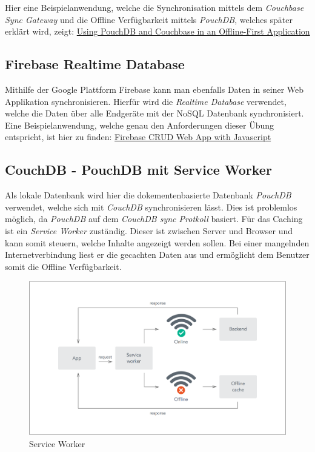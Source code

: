 Hier eine Beispielanwendung, welche die Synchronisation mittels dem \textit{Couchbase Sync Gateway} und die Offline Verfügbarkeit mittels \textit{PouchDB}, welches später erklärt wird, zeigt:
\href{https://www.codementor.io/pmbanugo/using-pouchdb-and-couchbase-in-an-offline-first-application-5pw2sxs6o}{Using PouchDB and Couchbase in an Offline-First Application\cite{syncgatewaytutorial}}

\url{}

\subsection{Firebase Realtime Database}
Mithilfe der Google Plattform Firebase kann man ebenfalls Daten in seiner Web Applikation synchronisieren. Hierfür wird die \textit{Realtime Database}\cite{realtimedb} verwendet, welche die Daten über alle Endgeräte mit der NoSQL Datenbank synchronisiert. Eine Beispielanwendung, welche genau den Anforderungen dieser Übung entspricht, ist hier zu finden: \href{http://softauthor.com/learn-to-build-firebase-crud-app-with-javascript-part01-reading-data/}{Firebase CRUD Web App with Javascript}\cite{firebaseexample} 


\subsection{CouchDB - PouchDB mit Service Worker}
Als lokale Datenbank wird hier die dokementenbasierte Datenbank \textit{PouchDB} verwendet, welche sich mit \textit{CouchDB} synchronisieren lässt. Dies ist problemlos möglich, da \textit{PouchDB} auf dem \textit{CouchDB sync Protkoll}\cite{couchdbsyncprot} basiert.\cite{pouchdbintro} Für das Caching ist ein \textit{Service Worker}\cite{serviceworker} zuständig. Dieser ist zwischen Server und Browser und kann somit steuern, welche Inhalte angezeigt werden sollen. Bei einer mangelnden Internetverbindung liest er die gecachten Daten aus und ermöglicht dem Benutzer somit die Offline Verfügbarkeit.

\begin{figure}[!h]
  \begin{center}
    \includegraphics[width=0.7\linewidth]{images/offline-first-diagram.png}
     \caption{Service Worker\cite{serviceworkertutorial}}
    \label{broker}
  \end{center}
\end{figure}


